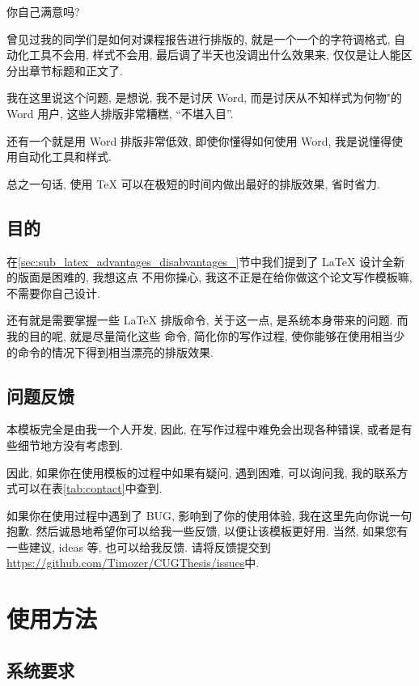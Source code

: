 \documentclass{cugthesis}
\begin{document}
    你自己满意吗?

    曾见过我的同学们是如何对课程报告进行排版的, 就是一个一个的字符调格式, 自动化工具不会用, 样式不会用,
    最后调了半天也没调出什么效果来, 仅仅是让人能区分出章节标题和正文了.

    我在这里说这个问题, 是想说, 我不是讨厌 Word, 而是讨厌从不知样式为何物"的 Word 用户, 这些人排版非常糟糕,
    ``不堪入目''.

    还有一个就是用 Word 排版非常低效, 即使你懂得如何使用 Word, 我是说懂得使用自动化工具和样式.

    总之一句话, 使用 \TeX{} 可以在极短的时间内做出最好的排版效果, 省时省力.

\section{目的}
\label{sec:mu_di_}
    在\ref{sec:sub_latex_advantages_disabvantages_}节中我们提到了 \LaTeX{} 设计全新的版面是困难的, 我想这点
    不用你操心, 我这不正是在给你做这个论文写作模板嘛, 不需要你自己设计.

    还有就是需要掌握一些 \LaTeX{} 排版命令, 关于这一点, 是系统本身带来的问题. 而我的目的呢, 就是尽量简化这些
    命令, 简化你的写作过程, 使你能够在使用相当少的命令的情况下得到相当漂亮的排版效果.

\section{问题反馈}
\label{sec:wen_ti_fan_kui_}
    本模板完全是由我一个人开发, 因此, 在写作过程中难免会出现各种错误, 或者是有些细节地方没有考虑到.

    因此, 如果你在使用模板的过程中如果有疑问, 遇到困难, 可以询问我, 我的联系方式可以在表\ref{tab:contact}中查到.
    
    如果你在使用过程中遇到了 BUG, 影响到了你的使用体验, 我在这里先向你说一句抱歉.
    然后诚恳地希望你可以给我一些反馈, 以便让该模板更好用. 当然, 如果您有一些建议, ideas 等, 也可以给我反馈. 
    请将反馈提交到
    \url{https://github.com/Timozer/CUGThesis/issues}中.


\chapter{使用方法}

\section{系统要求}
\label{sec:xi_tong_yao_qiu_}
\end{document}
